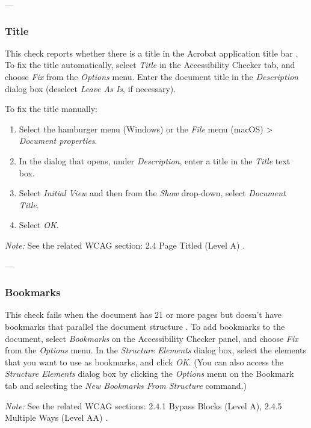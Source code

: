 ---

\subsubsection{Title}
\label{subsubsec:acrobat-title}
This check reports whether there is a title in the Acrobat application title bar \cite{AdobeHelpX}.
To fix the title automatically, select \emph{Title} in the Accessibility Checker tab, and choose \emph{Fix} from the \emph{Options} menu. Enter the document title in the \emph{Description} dialog box (deselect \emph{Leave As Is}, if necessary).

To fix the title manually:
\begin{enumerate}
    \item Select the hamburger menu (Windows) or the \emph{File} menu (macOS) > \emph{Document properties}.
    \item In the dialog that opens, under \emph{Description}, enter a title in the \emph{Title} text box.
    \item Select \emph{Initial View} and then from the \emph{Show} drop-down, select \emph{Document Title}.
    \item Select \emph{OK}.
\end{enumerate}

\vspace{0.5em}
\noindent\textit{Note:} See the related WCAG section: 2.4 Page Titled (Level A) \cite{WCAG}.

---

\subsubsection{Bookmarks}
\label{subsubsec:acrobat-bookmarks}
This check fails when the document has 21 or more pages but doesn't have bookmarks that parallel the document structure \cite{AdobeHelpX}.
To add bookmarks to the document, select \emph{Bookmarks} on the Accessibility Checker panel, and choose \emph{Fix} from the \emph{Options} menu. In the \emph{Structure Elements} dialog box, select the elements that you want to use as bookmarks, and click \emph{OK}. (You can also access the \emph{Structure Elements} dialog box by clicking the \emph{Options} menu on the Bookmark tab and selecting the \emph{New Bookmarks From Structure} command.)

\vspace{0.5em}
\noindent\textit{Note:} See the related WCAG sections: 2.4.1 Bypass Blocks (Level A), 2.4.5 Multiple Ways (Level AA) \cite{WCAG}.

